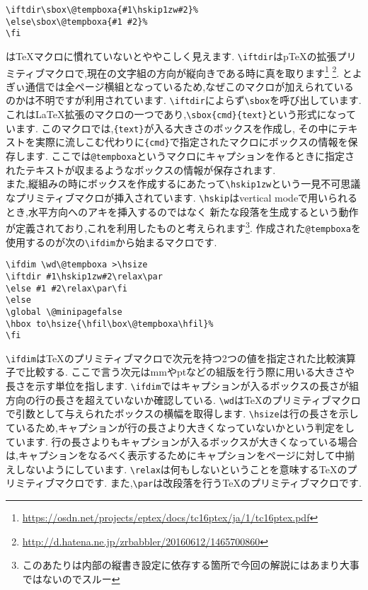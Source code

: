 \begin{verbatim}
\iftdir\sbox\@tempboxa{#1\hskip1zw#2}%
\else\sbox\@tempboxa{#1 #2}%
\fi
\end{verbatim}%
は{\TeX}マクロに慣れていないとややこしく見えます.
\verb|\iftdir|は{p\TeX}の拡張プリミティブマクロで,現在の文字組の方向が縦向きである時に真を取ります\footnote{\url{https://osdn.net/projects/eptex/docs/tc16ptex/ja/1/tc16ptex.pdf}}
\footnote{\url{http://d.hatena.ne.jp/zrbabbler/20160612/1465700860}}.
とよぎぃ通信では全ページ横組となっているため,なぜこのマクロが加えられているのかは不明ですが利用されています.
\verb|\iftdir|によらず\verb|\sbox|を呼び出しています.
これは{\LaTeX}拡張のマクロの一つであり,\verb|\sbox{cmd}{text}|という形式になっています.
このマクロでは,\verb|{text}|が入る大きさのボックスを作成し,
その中にテキストを実際に流しこむ代わりに\verb|{cmd}|で指定されたマクロにボックスの情報を保存します.
ここでは\verb|@tempboxa|というマクロにキャプションを作るときに指定されたテキストが収まるようなボックスの情報が保存されます.\\
また,縦組みの時にボックスを作成するにあたって\verb|\hskip1zw|という一見不可思議なプリミティブマクロが挿入されています.
\verb|\hskip|はvertical modeで用いられるとき,水平方向へのアキを挿入するのではなく
新たな段落を生成するという動作が定義されており,これを利用したものと考えられます\footnote{このあたりは{\pTeX}内部の縦書き設定に依存する箇所で今回の解説にはあまり大事ではないのでスルー}.
作成された\verb|@tempboxa|を使用するのが次の\verb|\ifdim|から始まるマクロです.

\begin{verbatim}
\ifdim \wd\@tempboxa >\hsize
\iftdir #1\hskip1zw#2\relax\par
\else #1 #2\relax\par\fi
\else
\global \@minipagefalse
\hbox to\hsize{\hfil\box\@tempboxa\hfil}%
\fi
\end{verbatim}
\verb|\ifdim|は{\TeX}のプリミティブマクロで次元を持つ2つの値を指定された比較演算子で比較する.
ここで言う次元はmmやptなどの組版を行う際に用いる大きさや長さを示す単位を指します.
\verb|\ifdim|ではキャプションが入るボックスの長さが組方向の行の長さを超えていないか確認している.
\verb|\wd|は{\TeX}のプリミティブマクロで引数として与えられたボックスの横幅を取得します.
\verb|\hsize|は行の長さを示しているため,キャプションが行の長さより大きくなっていないかという判定をしています.
行の長さよりもキャプションが入るボックスが大きくなっている場合は,キャプションをなるべく表示するためにキャプションをページに対して中揃えしないようにしています.
\verb|\relax|は何もしないということを意味する{\TeX}のプリミティブマクロです.
また,\verb|\par|は改段落を行う{\TeX}のプリミティブマクロです.


